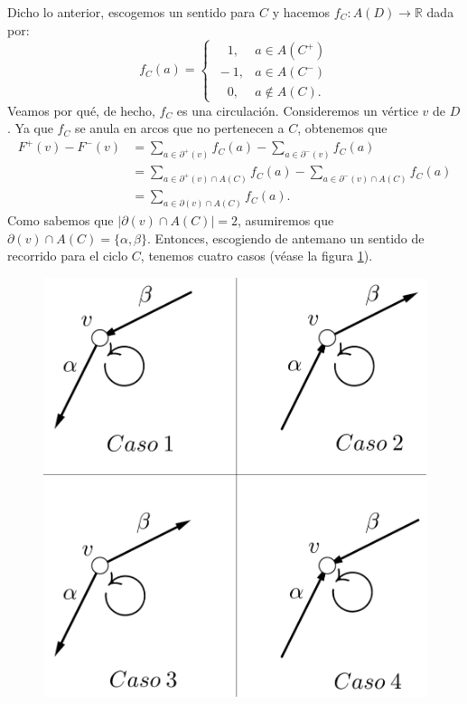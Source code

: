 Dicho lo anterior, escogemos un sentido para $C$ y hacemos $f_{C} \colon A(D) \rightarrow \mathbb{R}$ dada por:
$$
f_{C}(a)=\left\{\begin{matrix}
\quad 1, & a \in A(C^{+}) \\ 
\ -1, & a \in A(C^{-})\\ 
\quad 0, &a \notin A(C).
\end{matrix}\right.
$$
Veamos por qué, de hecho, $f_{C}$ es una circulación. Consideremos un vértice $v$ de $D$. Ya que $f_{C}$ se anula en arcos que no pertenecen a $C$, obtenemos que
\begin{equation} \label{eq:cortescicloscasos}
    \begin{split}
               F^{+}(v) - F^{-}(v) &= \sum_{a \in \partial^{+}(v)} f_{C}(a) - \sum_{a \in \partial^{-}(v)} f_{C}(a) \\
    &= \sum_{a \in \partial^{+}(v) \cap A(C)} f_{C}(a) - \sum_{a \in \partial^{-}(v) \cap A(C)} f_{C}(a) \\
    &= \sum_{a \in \partial(v) \cap A(C)} f_{C}(a).
    \end{split}
\end{equation}
Como sabemos que $|\partial(v) \cap A(C)| = 2$, asumiremos que $\partial(v) \cap A(C) = \{\alpha, \beta\}$. Entonces, escogiendo de antemano un sentido de recorrido para el ciclo $C$, tenemos cuatro casos (véase la figura \ref{fig:casoscortesciclos}). 
 \begin{figure}[H]
\centering
\includegraphics[scale=0.2]{img/imgchapter2/digraficacicloscasos.jpg}
\caption{}
\label{fig:casoscortesciclos}
\end{figure}
